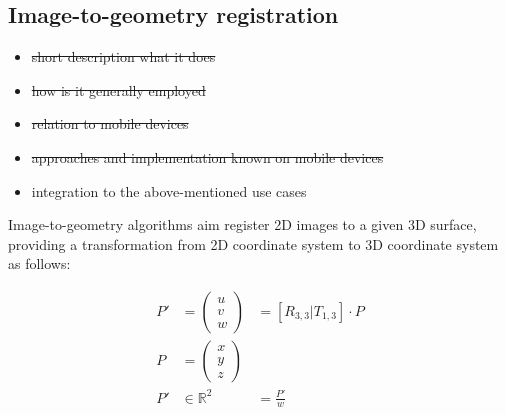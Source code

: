 \documentclass[review]{elsarticle}
\begin{document}


\subsection{Image-to-geometry registration}

\begin{itemize}
\item \sout{short description what it does}
\item \sout{how is it generally employed}
\item \sout{relation to mobile devices}
\item \sout{approaches and implementation known on mobile devices}
\item integration to the above-mentioned use cases
\end{itemize}

Image-to-geometry algorithms aim register 2D images to a given 3D surface, providing a transformation from 2D coordinate system to 3D coordinate system as follows:

\begin{eqnarray}
P' &= \begin{pmatrix}
u \\ v \\ w
\end{pmatrix} &= [ R_{3,3} | T_{1,3} ] \cdot P \\
P &= \begin{pmatrix}
x \\ y \\ z
\end{pmatrix} & \\
P' &\in \mathds{R}^2 &= \frac{P'}{w}
\end{eqnarray}
\end{document}
